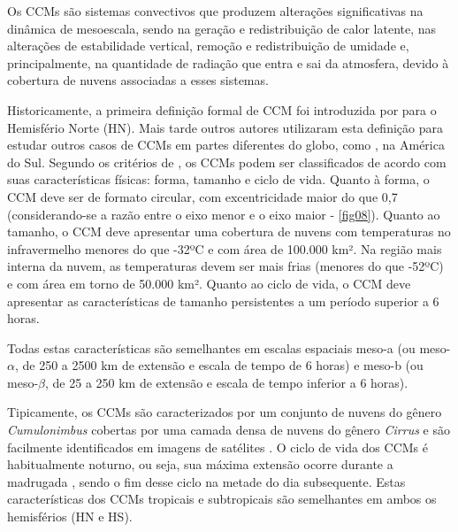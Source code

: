 Os CCMs são sistemas convectivos que produzem alterações significativas na dinâmica de mesoescala, sendo na geração e redistribuição de calor latente, nas alterações de estabilidade vertical, remoção e redistribuição de umidade e, principalmente, na quantidade de radiação que entra e sai da atmosfera, devido à cobertura de nuvens associadas a esses sistemas.

Historicamente, a primeira definição formal de CCM foi introduzida por \cite{maddox80} para o Hemisfério Norte (HN). Mais tarde outros autores utilizaram esta definição para estudar outros casos de CCMs em partes diferentes do globo, como \cite{velascofritsch87}, na América do Sul. Segundo os critérios de \cite{maddox80}, os CCMs podem ser classificados de acordo com suas características físicas: forma, tamanho e ciclo de vida. Quanto à forma, o CCM deve ser de formato circular, com excentricidade maior do que 0,7 (considerando-se a razão entre o eixo menor e o eixo maior - \autoref{fig08}). Quanto ao tamanho, o CCM deve apresentar uma cobertura de nuvens com temperaturas no infravermelho menores do que -32ºC e com área de 100.000 km². Na região mais interna da nuvem, as temperaturas devem ser mais frias (menores do que -52ºC) e com área em torno de 50.000 km². Quanto ao ciclo de vida, o CCM deve apresentar as características de tamanho persistentes a um período superior a 6 horas.

Todas estas características são semelhantes em escalas espaciais meso-a (ou meso-$\alpha$, de 250 a 2500 km de extensão e escala de tempo de 6 horas) e meso-b (ou meso-$\beta$, de 25 a 250 km de extensão e escala de tempo inferior a 6 horas).

Tipicamente, os CCMs são caracterizados por um conjunto de nuvens do gênero \textit{Cumulonimbus} cobertas por uma camada densa de nuvens do gênero \textit{Cirrus} e são facilmente identificados em imagens de satélites \cite{silvadias87}. O ciclo de vida dos CCMs é habitualmente noturno, ou seja, sua máxima extensão ocorre durante a madrugada \cite{velascofritsch87}, sendo o fim desse ciclo na metade do dia subsequente. Estas características dos CCMs tropicais e subtropicais são semelhantes em ambos os hemisférios (HN e HS).

